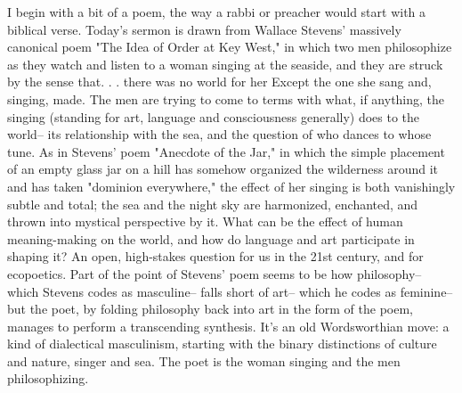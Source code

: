 \documentclass[draft]{article}
\begin{document}
\shapepar\Canflagshape
I begin with a bit of a poem, the way a rabbi or preacher would start with a biblical verse. Today's sermon is drawn from Wallace Stevens' massively canonical poem "The Idea of Order at Key West," in which two men philosophize as they watch and listen to a woman singing at the seaside, and they are struck by the sense that. . . there was no world for her Except the one she sang and, singing, made. The men are trying to come to terms with what, if anything, the singing (standing for art, language and consciousness generally) does to the world-- its relationship with the sea, and the question of who dances to whose tune. As in Stevens' poem "Anecdote of the Jar," in which the simple placement of an empty glass jar on a hill has somehow organized the wilderness around it and has taken "dominion everywhere," the effect of her singing is both vanishingly subtle and total; the sea and the night sky are harmonized, enchanted, and thrown into mystical perspective by it. What can be the effect of human meaning-making on the world, and how do language and art participate in shaping it? An open, high-stakes question for us in the 21st century, and for ecopoetics. Part of the point of Stevens' poem seems to be how philosophy-- which Stevens codes as masculine-- falls short of art-- which he codes as feminine-- but the poet, by folding philosophy back into art in the form of the poem, manages to perform a transcending synthesis. It's an old Wordsworthian move: a kind of dialectical masculinism, starting with the binary distinctions of culture and nature, singer and sea. The poet is the woman singing and the men philosophizing.
\end{document}
